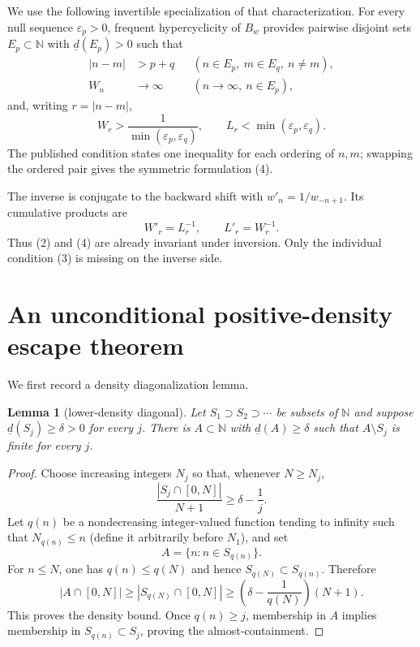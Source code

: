 \documentclass[11pt]{article}
\newtheorem{lemma}[theorem]{Lemma}
\newcommand{\N}{\mathbb N}
\newcommand{\ud}{\underline d}
\begin{document}
We use the following invertible specialization of that characterization.
For every null sequence $\varepsilon_p>0$, frequent hypercyclicity of $B_w$
provides pairwise disjoint sets $E_p\subset\N$ with $\ud(E_p)>0$ such that
\begin{align}
 |n-m|&>p+q
 &&(n\in E_p,\ m\in E_q,\ n\ne m),                                   \tag{2}\\
 W_n&\longrightarrow\infty
 &&(n\to\infty,\ n\in E_p),                                          \tag{3}
\end{align}
and, writing $r=|n-m|$,
\[
       W_r>\frac1{\min(\varepsilon_p,\varepsilon_q)},
       \qquad
       L_r<\min(\varepsilon_p,\varepsilon_q).                          \tag{4}
\]
The published condition states one inequality for each ordering of $n,m$;
swapping the ordered pair gives the symmetric formulation (4).

The inverse is conjugate to the backward shift with
$w'_n=1/w_{-n+1}$.  Its cumulative products are
\[
                  W'_r=L_r^{-1},\qquad L'_r=W_r^{-1}.                   \tag{5}
\]
Thus (2) and (4) are already invariant under inversion.  Only the individual
condition (3) is missing on the inverse side.

\section{An unconditional positive-density escape theorem}

We first record a density diagonalization lemma.

\begin{lemma}[lower-density diagonal]\label{lem:diagonal}
Let $S_1\supset S_2\supset\cdots$ be subsets of $\N$ and suppose
$\ud(S_j)\geq\delta>0$ for every $j$.  There is $A\subset\N$ with
$\ud(A)\geq\delta$ such that $A\setminus S_j$ is finite for every $j$.
\end{lemma}

\begin{proof}
Choose increasing integers $N_j$ so that, whenever $N\geq N_j$,
\[
 \frac{|S_j\cap[0,N]|}{N+1}\geq\delta-\frac1j.
\]
Let $q(n)$ be a nondecreasing integer-valued function tending to infinity
such that $N_{q(n)}\leq n$ (define it arbitrarily before $N_1$), and set
\[
                         A=\{n:n\in S_{q(n)}\}.
\]
For $n\leq N$, one has $q(n)\leq q(N)$ and hence
$S_{q(N)}\subset S_{q(n)}$.  Therefore
\[
 |A\cap[0,N]|\geq|S_{q(N)}\cap[0,N]|
 \geq\left(\delta-\frac1{q(N)}\right)(N+1).
\]
This proves the density bound.  Once $q(n)\geq j$, membership in $A$ implies
membership in $S_{q(n)}\subset S_j$, proving the almost-containment.
\end{proof}
\end{document}
